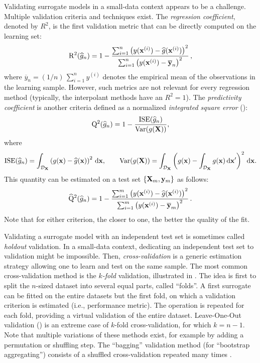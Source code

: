 Validating surrogate models in a small-data context appears to be a challenge. 
Multiple validation criteria and techniques exist. 
The \textit{regression coefficient}, denoted by $R^2$, is the first validation metric that can be directly computed on the learning set:
\begin{equation}
    \mathrm{R}^2(\widehat{g}_n) = 1 - \frac{ \sum_{i=1}^n  \left(y({\bf x}^{(i)}) - \widehat{g}({\bf x}^{(i)})\right)^2}{\sum_{i=1}^n \left(y({\bf x}^{(i)})-\overline{{\bf y}}_n\right)^2}\,,
\end{equation}
where $\overline{y}_n=(1/n)\,\sum_{i=1}^n y^{(i)}$ denotes the empirical mean of the observations in the learning sample. 
However, such metrics are not relevant for every regression method (typically, the interpolant methods have an $R^2=1$). 
The \textit{predictivity coefficient} is another criteria defined as a normalized \textit{integrated square error} (): 
\begin{equation}
    \mathrm{Q}^2(\widehat{g}_n) = 1 - \frac{\mathrm{ISE}(\widehat{g}_n)}{\operatorname{Var}(g({\bf X}))}, 
\end{equation} 
where 
\begin{equation}
    \mathrm{ISE}(\widehat{g}_n) = \int_{\mathcal{D}_{{\bf X}}} \left(g({\bf x}) - \widehat{g}({\bf x})\right)^2 \, \mathrm{d}{\bf x}, \qquad
    \operatorname{Var}(g({\bf X})) = \int_{\mathcal{D}_{{\bf X}}} \left(g({\bf x}) - \int_{\mathcal{D}_{{\bf X}}} g({\bf x})\, \mathrm{d}{\bf x}' \right)^2 \, \mathrm{d}{\bf x}.
\end{equation}
This quantity can be estimated on a test set $\left\{{\bf X}_m, {\bf y}_m\right\}$ as follows: 
\begin{equation}
    \widehat{\mathrm{Q}}^2(\widehat{g}_n) = 1 - \frac{ \sum_{i=1}^m  \left(y({\bf x}^{(i)}) - \widehat{g}({\bf x}^{(i)})\right)^2}{\sum_{i=1}^m \left(y({\bf x}^{(i)}) - \overline{{\bf y}}_m\right)^2}\,.
\end{equation}
Note that for either criterion, the closer to one, the better the quality of the fit. 

Validating a surrogate model with an independent test set is sometimes called \textit{holdout} validation.
In a small-data context, dedicating an independent test set to validation might be impossible.
Then, \textit{cross-validation} is a generic estimation strategy allowing one to learn and test on the same sample. 
The most common cross-validation method is the \textit{$k$-fold} validation, illustrated in . 
The idea is first to split the $n$-sized dataset into several equal parts, called ``folds''. 
A first surrogate can be fitted on the entire datasets but the first fold, on which a validation criterion is estimated (i.e., performance metric). 
The operation is repeated for each fold, providing a virtual validation of the entire dataset. 
Leave-One-Out validation () is an extreme case of $k$-fold cross-validation, for which $k=n-1$. 
Note that multiple variations of these methods exist, for example by adding a permutation or shuffling step. 
The ``bagging'' validation method (for ``bootstrap aggregating'') consists of a shuffled cross-validation repeated many times \citep{breiman_1996_bagging}. 

